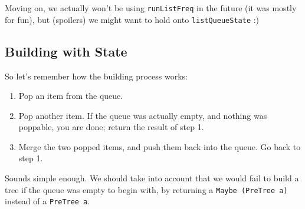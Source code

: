 \documentclass[]{article}
\begin{document}
Moving on, we actually won't be using \texttt{runListFreq} in the future (it was
mostly for fun), but (spoilers) we might want to hold onto
\texttt{listQueueState} :)

\hypertarget{building-with-state}{%
\subsection{Building with State}\label{building-with-state}}

So let's remember how the building process works:

\begin{enumerate}
\def\labelenumi{\arabic{enumi}.}
\tightlist
\item
  Pop an item from the queue.
\item
  Pop another item. If the queue was actually empty, and nothing was poppable,
  you are done; return the result of step 1.
\item
  Merge the two popped items, and push them back into the queue. Go back to step
  1.
\end{enumerate}

Sounds simple enough. We should take into account that we would fail to build a
tree if the queue was empty to begin with, by returning a
\texttt{Maybe\ (PreTree\ a)} instead of a \texttt{PreTree\ a}.
\end{document}
